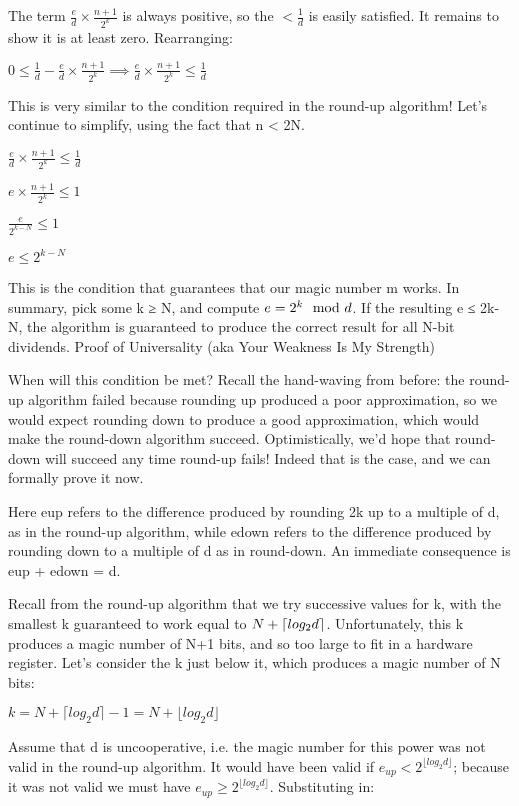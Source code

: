 The term $\frac e d \times \frac {n+1}{2^k}$ is always positive, so the $< \frac 1 d$ is easily satisfied. It remains to show it is at least zero. Rearranging:

$ 0 \le \frac 1 d - \frac e d \times \frac {n+1} {2^k} \implies \frac e d \times \frac {n+1} {2^k} \le \frac 1 d $

This is very similar to the condition required in the round-up algorithm! Let's continue to simplify, using the fact that n < 2N.

$ \frac e d \times \frac {n+1} {2^k} \le \frac 1 d$

$ e \times \frac {n+1} {2^k} \le 1 $

$ \frac e {2^{k-N}} \le 1 $

$ e \le 2^{k-N} $

This is the condition that guarantees that our magic number m works. In summary, pick some k ≥ N, and compute $ \small e = 2^k \mod{d} $. If the resulting e ≤ 2k-N, the algorithm is guaranteed to produce the correct result for all N-bit dividends.
Proof of Universality (aka Your Weakness Is My Strength)

When will this condition be met? Recall the hand-waving from before: the round-up algorithm failed because rounding up produced a poor approximation, so we would expect rounding down to produce a good approximation, which would make the round-down algorithm succeed. Optimistically, we'd hope that round-down will succeed any time round-up fails! Indeed that is the case, and we can formally prove it now.

Here eup refers to the difference produced by rounding 2k up to a multiple of d, as in the round-up algorithm, while edown refers to the difference produced by rounding down to a multiple of d as in round-down. An immediate consequence is eup + edown = d.

Recall from the round-up algorithm that we try successive values for k, with the smallest k guaranteed to work equal to $ \small N + \lceil log_2 d \rceil $. Unfortunately, this k produces a magic number of N+1 bits, and so too large to fit in a hardware register. Let's consider the k just below it, which produces a magic number of N bits:

$ k = N + \lceil log_2 d \rceil - 1 = N + \lfloor log_2 d \rfloor $

Assume that d is uncooperative, i.e. the magic number for this power was not valid in the round-up algorithm. It would have been valid if $ e_{up} < 2^{\lfloor log_2 d \rfloor} $; because it was not valid we must have $ e_{up} \ge 2^{\lfloor log_2 d \rfloor} $. Substituting in:

